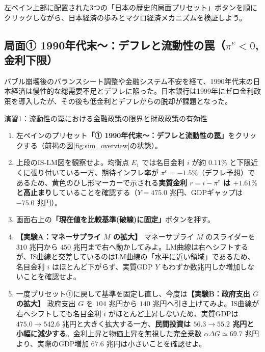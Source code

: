\documentclass[lualatex,a4paper,11pt,ja=standard]{bxjsarticle}
\begin{document}
左ペイン上部に配置された3つの「日本の歴史的局面プリセット」ボタンを順にクリックしながら、日本経済の歩みとマクロ経済メカニズムを検証しよう。

\subsection{局面① 1990年代末〜：デフレと流動性の罠（\texorpdfstring{$\pi^e < 0$}{πe < 0}, 金利下限）}

バブル崩壊後のバランスシート調整や金融システム不安を経て、1990年代末の日本経済は慢性的な総需要不足とデフレに陥った。日本銀行は1999年にゼロ金利政策を導入したが、その後も低金利とデフレからの脱却が課題となった。

\begin{simbox}{演習1：流動性の罠における金融政策の限界と財政政策の有効性}
\begin{enumerate}[leftmargin=6mm]
  \item 左ペインのプリセット\textbf{「① 1990年代末〜：デフレと流動性の罠」}をクリックする（前掲の図\ref{fig:sim_overview}の状態）。
  \item 上段のIS-LM図を観察せよ。均衡点 $E_1$ では名目金利 $i$ が約 $0.11\%$ と下限近くに張り付いている一方、期待インフレ率が $\pi^e = -1.5\%$（デフレ予想）であるため、黄色のひし形マーカーで示される\textbf{実質金利 $r = i - \pi^e$ は $+1.61\%$ と高止まり}していることを確認する（$Y = 475.0$ 兆円、GDPギャップは $-75.0$ 兆円）。
  \item 画面右上の\textbf{「現在値を比較基準(破線)に固定」}ボタンを押す。
  \item \textbf{【実験A：マネーサプライ $M$ の拡大】} マネーサプライ $M$ のスライダーを $310$ 兆円から $450$ 兆円まで右へ動かしてみよ。LM曲線は右へシフトするが、IS曲線と交差しているのはLM曲線の「水平に近い領域」であるため、名目金利 $i$ はほとんど下がらず、実質GDP $Y$ もわずか数兆円しか増加しないことを確認せよ。
  \item 一度プリセット①に戻して基準を固定し直し、今度は\textbf{【実験B：政府支出 $G$ の拡大】} 政府支出 $G$ を $104$ 兆円から $140$ 兆円へ引き上げてみよ。IS曲線が右へシフトしても名目金利 $i$ がほとんど上昇しないため、実質GDPは $475.0 \to 542.6$ 兆円と大きく拡大する一方、\textbf{民間投資は $56.3 \to 55.2$ 兆円と小幅に減少する}。金利上昇と物価上昇を無視した完全乗数 $\alpha \Delta G \simeq 69.7$ 兆円より、実際のGDP増加 $67.6$ 兆円は小さいことを確認せよ。
\end{enumerate}
\end{simbox}
\end{document}
